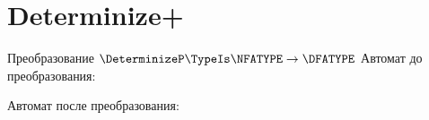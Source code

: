 \section{Determinize+}
\begin{frame}{Преобразование $\DeterminizeP\TypeIs\NFATYPE\to\DFATYPE$}
	Автомат до преобразования:


	Автомат после преобразования:


\end{frame}
